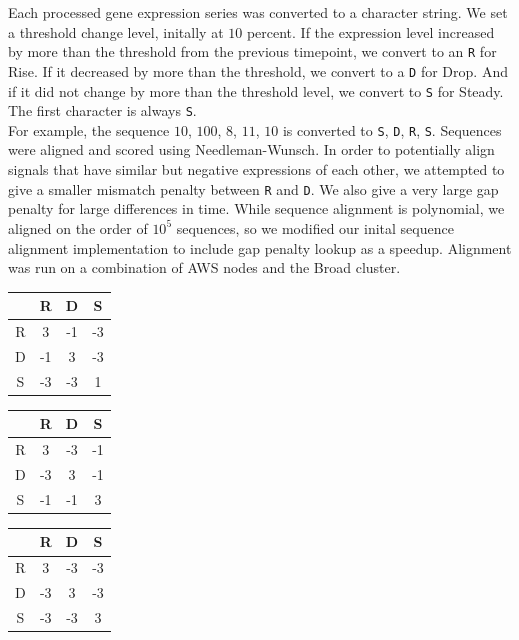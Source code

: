 \documentclass[aps,prd,final,onecolumn,a4paper,10pt]{revtex4}
\begin{document}
Each processed gene expression series was converted to a character string.
We set a threshold change level, initally at $10$ percent.
If the expression level increased by more than the threshold from the previous timepoint, we convert to an \verb!R! for Rise.
If it decreased by more than the threshold, we convert to a \verb!D! for Drop.
And if it did not change by more than the threshold level, we convert to \verb!S! for Steady. The first character is always \verb!S!.\\

For example, the sequence $10$, $100$, $8$, $11$, $10$ is converted to \verb!S!, \verb!D!, \verb!R!, \verb!S!. Sequences were aligned and scored using Needleman-Wunsch.
In order to potentially align signals that have similar but negative expressions of each other, we attempted to give a smaller mismatch penalty between \verb!R! and \verb!D!.
We also give a very large gap penalty for large differences in time.
While sequence alignment is polynomial, we aligned on the order of $10^5$ sequences, so we modified our inital sequence alignment implementation to include gap penalty lookup as a speedup.
Alignment was run on a combination of AWS nodes and the Broad cluster.


\begin{center}
\begin{tabular}{c | ccc}
  & R & D & S\\ \hline

  R &  3 & -1 & -3\\
  D & -1 & 3 & -3\\
  S & -3 & -3 & 1\\
\end{tabular}
\quad
\begin{tabular}{c | ccc}
  & R & D & S\\ \hline

  R &  3 & -3 & -1\\
  D & -3 & 3 & -1\\
  S & -1 & -1 & 3\\
\end{tabular}
\quad
\begin{tabular}{c | ccc}
  & R & D & S\\ \hline

  R &  3 & -3 & -3\\
  D & -3 & 3 & -3\\
  S & -3 & -3 & 3\\
\end{tabular}
\end{center}
\end{document}

